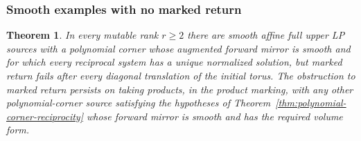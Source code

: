 \documentclass[11pt,reqno]{amsart}
\numberwithin{equation}{section}
\newtheorem{theorem}{Theorem}[section]
\theoremstyle{definition}
\theoremstyle{remark}
\begin{document}
\subsubsection{Smooth examples with no marked return}

\begin{theorem}\label{thm:smooth-both-sides-nonreturn}
In every mutable rank \(r\ge2\) there are smooth affine full upper
LP sources with a polynomial corner whose augmented forward mirror is
smooth and for which every reciprocal system has a unique normalized
solution, but marked return fails after every diagonal translation of
the initial torus. The obstruction to marked return persists on taking
products, in the product marking, with any other polynomial-corner source
satisfying the hypotheses of Theorem~\ref{thm:polynomial-corner-reciprocity}
whose forward mirror is smooth and has the required volume form.
\end{theorem}
\end{document}
